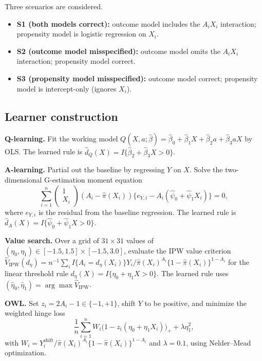 \documentclass[master.tex]{subfiles}
\begin{document}
Three scenarios are considered.
\begin{itemize}
  \item \textbf{S1 (both models correct):} outcome model includes the
    $A_i X_i$ interaction; propensity model is logistic regression on $X_i$.
  \item \textbf{S2 (outcome model misspecified):} outcome model omits the
    $A_i X_i$ interaction; propensity model correct.
  \item \textbf{S3 (propensity model misspecified):} outcome model correct;
    propensity model is intercept-only (ignores $X_i$).
\end{itemize}

\subsection{Learner construction}
\label{w14:subsec:lab-learners}

\medskip\noindent
\textbf{Q-learning.} Fit the working model
$Q(X,a;\hat\beta)=\hat\beta_0+\hat\beta_1 X+\hat\beta_2 a+\hat\beta_3 aX$
by OLS. The learned rule is
$\hat d_Q(X)=I\{\hat\beta_2+\hat\beta_3 X>0\}$.

\medskip\noindent
\textbf{A-learning.} Partial out the baseline by regressing $Y$ on $X$.
Solve the two-dimensional G-estimation moment equation
\[
\sum_{i=1}^n
\begin{pmatrix}1\\X_i\end{pmatrix}
(A_i-\hat\pi(X_i))
\bigl\{e_{Y,i} - A_i(\hat\psi_0+\hat\psi_1 X_i)\bigr\}=0,
\]
where $e_{Y,i}$ is the residual from the baseline regression. The learned
rule is $\hat d_A(X)=I\{\hat\psi_0+\hat\psi_1 X>0\}$.

\medskip\noindent
\textbf{Value search.} Over a grid of $31\times31$ values of
$(\eta_0,\eta_1)\in[-1.5,1.5]\times[-1.5,3.0]$, evaluate the IPW value
criterion
$\widehat V_{\mathrm{IPW}}(d_\eta)
 =n^{-1}\sum_i I\{A_i=d_\eta(X_i)\}Y_i /
  \hat\pi(X_i)^{A_i}\{1-\hat\pi(X_i)\}^{1-A_i}$
for the linear threshold rule $d_\eta(X)=I\{\eta_0+\eta_1 X>0\}$. The
learned rule uses $(\hat\eta_0,\hat\eta_1)=\arg\max\widehat V_{\mathrm{IPW}}$.

\medskip\noindent
\textbf{OWL.} Set $z_i=2A_i-1\in\{-1,+1\}$, shift $Y$ to be positive, and
minimize the weighted hinge loss
\[
\frac{1}{n}\sum_{i=1}^n W_i\bigl(1-z_i(\eta_0+\eta_1 X_i)\bigr)_+
+\lambda\eta_1^2,
\]
with $W_i=Y_i^{\mathrm{shift}}/\hat\pi(X_i)^{A_i}\{1-\hat\pi(X_i)\}^{1-A_i}$
and $\lambda=0.1$, using Nelder--Mead optimization.
\end{document}

